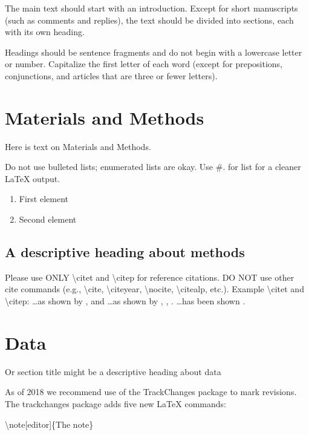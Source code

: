 \documentclass[draft,linenumbers]{agujournal2018}
\begin{document}
The main text should start with an introduction. Except for short
manuscripts (such as comments and replies), the text should be divided
into sections, each with its own heading.

Headings should be sentence fragments and do not begin with a lowercase
letter or number. Capitalize the first letter of each word (except for
prepositions, conjunctions, and articles that are three or fewer
letters).

\section{Materials and Methods}

Here is text on Materials and Methods.

Do not use bulleted lists; enumerated lists are okay. Use \#. for list
for a cleaner LaTeX output.

\begin{enumerate}
\item
  First element
\item
  Second element
\end{enumerate}

\subsection{A descriptive heading about methods}

Please use ONLY \textbackslash{}citet and \textbackslash{}citep for
reference citations. DO NOT use other cite commands (e.g.,
\textbackslash{}cite, \textbackslash{}citeyear, \textbackslash{}nocite,
\textbackslash{}citealp, etc.). Example \textbackslash{}citet and
\textbackslash{}citep: \ldots{}as shown by \citet{Levitus2012},
\citet{Nuncio2011} and \citet{Raphael2004} \ldots{}as shown by
\citep{Levitus2012}, \citep{Nuncio2011}, \citep{Raphael2004}.
\ldots{}has been shown
\citep[e.g.,][]{Levitus2012, Nuncio2011, Raphael2004}.

\section{Data}

Or section title might be a descriptive heading about data

As of 2018 we recommend use of the TrackChanges package to mark
revisions. The trackchanges package adds five new LaTeX commands:

\textbackslash{}note{[}editor{]}\{The note\}
\end{document}

